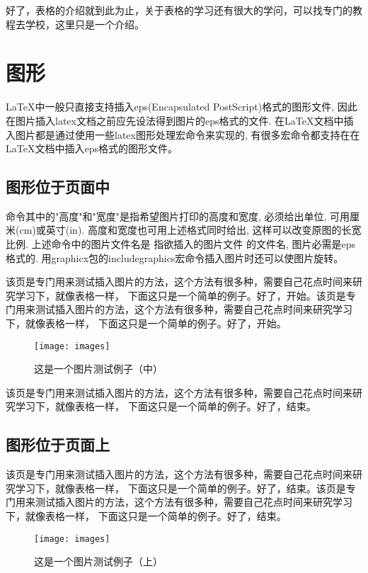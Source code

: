 好了，表格的介绍就到此为止，关于表格的学习还有很大的学问，可以找专门的教程去学校，这里只是一个介绍。

\section{图形}
LaTeX中一般只直接支持插入eps(Encapsulated PostScript)格式的图形文件, 因此在图片插入latex文档之前应先设法得到图片的eps格式的文件.
在LaTeX文档中插入图片都是通过使用一些latex图形处理宏命令来实现的, 有很多宏命令都支持在在LaTeX文档中插入eps格式的图形文件。
\subsection{图形位于页面中}
命令其中的"高度"和"宽度"是指希望图片打印的高度和宽度, 必须给出单位, 可用厘米(cm)或英寸(in). 高度和宽度也可用上述格式同时给出, 这样可以改变原图的长宽比例. 上述命令中的图片文件名是
指欲插入的图片文件 的文件名, 图片必需是eps格式的.
用graphicx包的includegraphics宏命令插入图片时还可以使图片旋转。

该页是专门用来测试插入图片的方法，这个方法有很多种，需要自己花点时间来研究学习下，就像表格一样，
下面这只是一个简单的例子。好了，开始。该页是专门用来测试插入图片的方法，这个方法有很多种，需要自己花点时间来研究学习下，就像表格一样，
下面这只是一个简单的例子。好了，开始。

\begin{figure}[h]
 \centering
 \texttt{[image: images]}
 \caption{这是一个图片测试例子（中）}
 \label{fig:amss1}
\end{figure}

该页是专门用来测试插入图片的方法，这个方法有很多种，需要自己花点时间来研究学习下，就像表格一样，
下面这只是一个简单的例子。好了，结束。

\subsection{图形位于页面上}
该页是专门用来测试插入图片的方法，这个方法有很多种，需要自己花点时间来研究学习下，就像表格一样，
下面这只是一个简单的例子。好了，结束。该页是专门用来测试插入图片的方法，这个方法有很多种，需要自己花点时间来研究学习下，就像表格一样，
下面这只是一个简单的例子。好了，结束。

\begin{figure}[t]
 \centering
 \texttt{[image: images]}
 \caption{这是一个图片测试例子（上）}
 \label{fig:amss2}
\end{figure}

